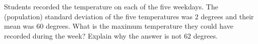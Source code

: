 Students recorded the temperature on each of the five weekdays. The (population) standard deviation of the five temperatures was $2$ degrees and their mean was $60$ degrees. What is the maximum temperature they could have recorded during the week? Explain why the answer is not $62$ degrees.

